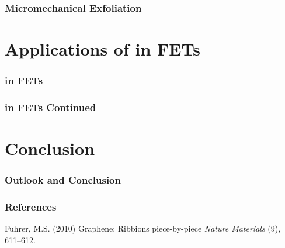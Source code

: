 \documentclass{beamer}
\begin{document}
\begin{frame}
\frametitle{Micromechanical Exfoliation}
\end{frame}

\section{Applications of  in FETs}
\begin{frame}
\frametitle{ in FETs}
\end{frame}

\begin{frame}
\frametitle{ in FETs Continued}
\end{frame}

\section{Conclusion}
\begin{frame}
\frametitle{Outlook and Conclusion}
\end{frame}

\begin{frame}
\frametitle{References}
\footnotesize{
	\begin{thebibliography}{99}
	 Fuhrer, M.S. (2010)
	\newblock  Graphene: Ribbions piece-by-piece
	\newblock \emph{Nature Materials} (9), 611--612.
	\end{thebibliography}
}
\end{frame}

\end{document}
